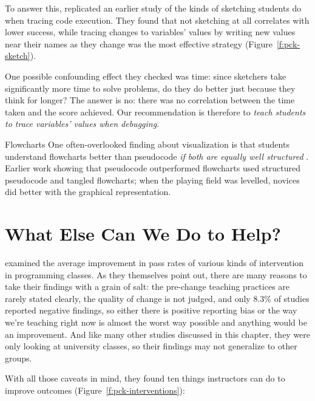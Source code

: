 To answer this, \cite{Cunn2017} replicated an earlier study of the
kinds of sketching students do when tracing code execution. They found
that not sketching at all correlates with lower success, while tracing
changes to variables' values by writing new values near their names as
they change was the most effective strategy (Figure~\ref{f:pck-sketch}).

One possible confounding effect they checked was time: since sketchers
take significantly more time to solve problems, do they do better just
because they think for longer? The answer is no: there was no
correlation between the time taken and the score achieved. Our
recommendation is therefore to \emph{teach students to trace variables'
values when debugging}.

\begin{aside}{Flowcharts}
  One often-overlooked finding about visualization is that students
  understand flowcharts better than pseudocode \emph{if both are equally well
    structured} \cite{Scan1989}. Earlier work showing that pseudocode
  outperformed flowcharts used structured pseudocode and tangled
  flowcharts; when the playing field was levelled, novices did better
  with the graphical representation.
\end{aside}

\section{What Else Can We Do to Help?}\label{s:pck-help}

\cite{Viha2014} examined the average improvement in pass rates of
various kinds of intervention in programming classes. As they themselves
point out, there are many reasons to take their findings with a grain of
salt: the pre-change teaching practices are rarely stated clearly, the
quality of change is not judged, and only 8.3\% of studies reported
negative findings, so either there is positive reporting bias or the way
we're teaching right now is almost the worst way possible and anything
would be an improvement. And like many other studies discussed in this
chapter, they were only looking at university classes, so their findings
may not generalize to other groups.

With all those caveats in mind, they found ten things instructors can do
to improve outcomes (Figure~\ref{f:pck-interventions}):

